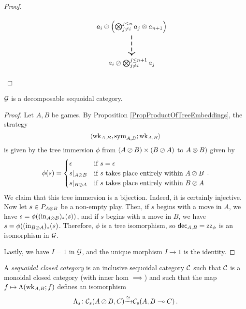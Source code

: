 \begin{proof}
\begin{SidewaysFigure}
\[\begin{tikzcd}[ampersand replacement=\&, column sep=6pt, row sep=30pt]
          \&
            \&
              \& |[alias=Y]| a_i \sequoid \left(\Tensor_{j\ne i}^{j\le n} a_j \tensor a_{n+1}\right) \arrow[d, thick, dashed] \\
          \&
            \&
              \& a_i \sequoid \Tensor_{j\ne i}^{j\le n+1}a_j
      \end{tikzcd}
      \]
    \caption[Diagram used in the proof of Proposition \ref{PropDecSeqFormula}]{Diagram used in the proof of Proposition \ref{PropDecSeqFormula}.  
    The pentagon at the heart of the diagram is the coherence diagram for $\passoc$ and $\wk$ from Definition \ref{DefSequoidalCategory}.}
    \label{FigDecSeqFormula}
  \end{SidewaysFigure}
\end{proof}

\begin{proposition}
  $\mathcal G$ is a decomposable sequoidal category.
\end{proposition}
\begin{proof}
  Let $A,B$ be games.  
  By Proposition \ref{PropProductOfTreeEmbeddings}, the strategy 
  \[
    \langle \operatorname{wk}_{A,B},\operatorname{sym}_{A,B};\operatorname{wk}_{A,B}\rangle
    \]
  is given by the tree immersion $\phi$ from $(A \oslash B) \times (B \oslash A)$ to $A \otimes B)$ given by
  \[
    \phi(s) = \begin{cases}
      \epsilon & \text{if $s=\epsilon$} \\
      s\vert_{A \oslash B} & \text{if $s$ takes place entirely within $A\oslash B$} \\
      s\vert_{B \oslash A} & \text{if $s$ takes place entirely within $B\oslash A$}
    \end{cases}\,.
    \]
  We claim that this tree immersion is a bijection.  
  Indeed, it is certainly injective.
  Now let $s\in P_{A\otimes B}$ be a non-empty play.  
  Then, if $s$ begins with a move in $A$, we have $s=\phi((\operatorname{in}_{A\oslash B})_*(s))$, and if $s$ begins with a move in $B$, we have $s=\phi((\operatorname{in}_{B\oslash A})_*(s)$.  
  Therefore, $\phi$ is a tree isomorphism, so $\operatorname{{\mathsf{dec}}}_{A,B}=\operatorname{zz}_\phi$ is an isomorphism in $\mathcal G$.

  Lastly, we have $I=1$ in $\mathcal G$, and the unique morphism $I\to 1$ is the identity.
\end{proof}

\begin{definition}
  A \emph{sequoidal closed category} is an inclusive sequoidal category ${\mathcal{C}}$ such that ${\mathcal{C}}$ is a monoidal closed category (with inner hom $\implies$) and such that the map $f\mapsto \Lambda(\operatorname{wk}_{A,B};f)$ defines an isomorphism
  \[
    \Lambda_s \colon {\mathcal{C}}_s(A \oslash B,C) {\xrightarrow{\cong}} {\mathcal{C}}_s(A,B\multimap C)\,.
    \]
\end{definition}

